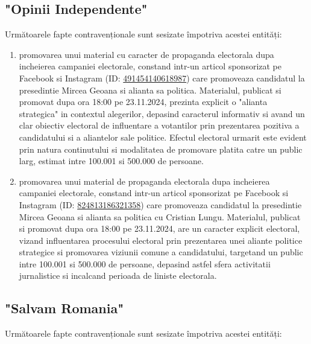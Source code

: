 \documentclass[a4paper,12pt]{article}
\begin{document}
\vspace{0.5cm}

\subsection{"Opinii Independente"}
Următoarele fapte contravenționale sunt sesizate împotriva acestei entități:

\begin{enumerate}[leftmargin=*, label=\arabic*.)]
    \item promovarea unui material cu caracter de propaganda electorala dupa incheierea campaniei electorale, constand intr-un articol sponsorizat pe Facebook si Instagram (ID: \href{https://www.facebook.com/ads/library/?id=491454140618987}{491454140618987}) care promoveaza candidatul la presedintie Mircea Geoana si alianta sa politica. Materialul, publicat si promovat dupa ora 18:00 pe 23.11.2024, prezinta explicit o "alianta strategica" in contextul alegerilor, depasind caracterul informativ si avand un clar obiectiv electoral de influentare a votantilor prin prezentarea pozitiva a candidatului si a aliantelor sale politice. Efectul electoral urmarit este evident prin natura continutului si modalitatea de promovare platita catre un public larg, estimat intre 100.001 si 500.000 de persoane.
    \item promovarea unui material de propaganda electorala dupa incheierea campaniei electorale, constand intr-un articol sponsorizat pe Facebook si Instagram (ID: \href{https://www.facebook.com/ads/library/?id=824813186321358}{824813186321358}) care promoveaza candidatul la presedintie Mircea Geoana si alianta sa politica cu Cristian Lungu. Materialul, publicat si promovat dupa ora 18:00 pe 23.11.2024, are un caracter explicit electoral, vizand influentarea procesului electoral prin prezentarea unei aliante politice strategice si promovarea viziunii comune a candidatului, targetand un public intre 100.001 si 500.000 de persoane, depasind astfel sfera activitatii jurnalistice si incalcand perioada de liniste electorala.
\end{enumerate}

\vspace{0.5cm}

\subsection{"Salvam Romania"}
Următoarele fapte contravenționale sunt sesizate împotriva acestei entități:
\end{document}
